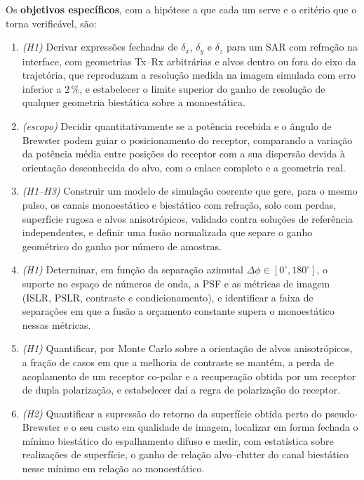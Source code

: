 \documentclass[12pt,a4paper,oneside]{book}
\theoremstyle{remark}
\theoremstyle{plain}
\theoremstyle{definition}
\begin{document}
Os \textbf{objetivos específicos}, com a hipótese a que cada um serve e o
critério que o torna verificável, são:

\begin{enumerate}[label=\textbf{O\arabic*.},leftmargin=*]
  \item \emph{(H1)} Derivar expressões fechadas de $\delta_x$, $\delta_y$ e
  $\delta_z$ para um SAR com refração na interface, com geometrias Tx--Rx
  arbitrárias e alvos dentro ou fora do eixo da trajetória, que reproduzam a
  resolução medida na imagem simulada com erro inferior a $2\,\%$, e
  estabelecer o limite superior do ganho de resolução de qualquer geometria
  biestática sobre a monoestática.
  \item \emph{(escopo)} Decidir quantitativamente se a potência recebida e o
  ângulo de Brewster podem guiar o posicionamento do receptor, comparando a
  variação da potência média entre posições do receptor com a sua dispersão
  devida à orientação desconhecida do alvo, com o enlace completo e a
  geometria real.
  \item \emph{(H1--H3)} Construir um modelo de simulação coerente que gere,
  para o mesmo pulso, os canais monoestático e biestático com refração, solo com
  perdas, superfície rugosa e alvos anisotrópicos, validado contra soluções de
  referência independentes, e definir uma fusão normalizada que separe o ganho
  geométrico do ganho por número de amostras.
  \item \emph{(H1)} Determinar, em função da separação azimutal
  $\Delta\phi\in[0^\circ,180^\circ]$, o suporte no espaço de números de onda, a
  PSF e as métricas de imagem (ISLR, PSLR, contraste e condicionamento), e
  identificar a faixa de separações em que a fusão a orçamento constante supera
  o monoestático nessas métricas.
  \item \emph{(H1)} Quantificar, por Monte Carlo sobre a orientação de alvos
  anisotrópicos, a fração de casos em que a melhoria de contraste se mantém, a
  perda de acoplamento de um receptor co-polar e a recuperação obtida por um
  receptor de dupla polarização, e estabelecer daí a regra de polarização do
  receptor.
  \item \emph{(H2)} Quantificar a supressão do retorno da superfície obtida
  perto do pseudo-Brewster e o seu custo em qualidade de imagem, localizar em
  forma fechada o mínimo biestático do espalhamento difuso e medir, com
  estatística sobre realizações de superfície, o ganho de relação alvo--clutter
  do canal biestático nesse mínimo em relação ao monoestático.

\end{enumerate}
\end{document}
